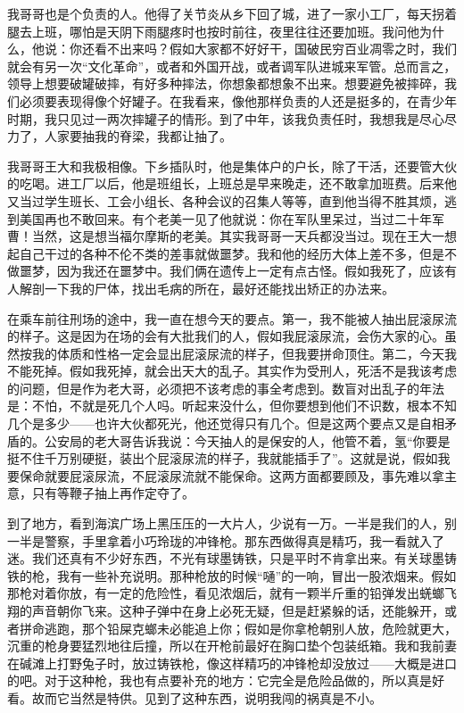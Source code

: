 我哥哥也是个负责的人。他得了关节炎从乡下回了城，进了一家小工厂，每天拐着腿去上班，哪怕是天阴下雨腿疼时也按时前往，夜里往往还要加班。我问他为什么，他说：你还看不出来吗？假如大家都不好好干，国破民穷百业凋零之时，我们就会有另一次“文化革命”，或者和外国开战，或者调军队进城来军管。总而言之，领导上想要破罐破摔，有好多种摔法，你想象都想象不出来。想要避免被摔碎，我们必须要表现得像个好罐子。在我看来，像他那样负责的人还是挺多的，在青少年时期，我只见过一两次摔罐子的情形。到了中年，该我负责任时，我想我是尽心尽力了，人家要抽我的脊梁，我都让抽了。 

我哥哥王大和我极相像。下乡插队时，他是集体户的户长，除了干活，还要管大伙的吃喝。进工厂以后，他是班组长，上班总是早来晚走，还不敢拿加班费。后来他又当过学生班长、工会小组长、各种会议的召集人等等，直到他当得不胜其烦，逃到美国再也不敢回来。有个老美一见了他就说：你在军队里呆过，当过二十年军曹！当然，这是想当福尔摩斯的老美。其实我哥哥一天兵都没当过。现在王大一想起自己干过的各种不伦不类的差事就做噩梦。我和他的经历大体上差不多，但是不做噩梦，因为我还在噩梦中。我们俩在遗传上一定有点古怪。假如我死了，应该有人解剖一下我的尸体，找出毛病的所在，最好还能找出矫正的办法来。 



在乘车前往刑场的途中，我一直在想今天的要点。第一，我不能被人抽出屁滚尿流的样子。这是因为在场的会有大批我们的人，假如我屁滚尿流，会伤大家的心。虽然按我的体质和性格一定会显出屁滚尿流的样子，但我要拼命顶住。第二，今天我不能死掉。假如我死掉，就会出天大的乱子。其实作为受刑人，死活不是我该考虑的问题，但是作为老大哥，必须把不该考虑的事全考虑到。数盲对出乱子的年法是：不怕，不就是死几个人吗。听起来没什么，但你要想到他们不识数，根本不知几个是多少——也许大伙都死光，他还觉得只有几个。但是这两个要点又是自相矛盾的。公安局的老大哥告诉我说：今天抽人的是保安的人，他管不着，氢“你要是挺不住千万别硬挺，装出个屁滚尿流的样子，我就能插手了”。这就是说，假如我要保命就要屁滚尿流，不屁滚尿流就不能保命。这两方面都要顾及，事先难以拿主意，只有等鞭子抽上再作定夺了。 



到了地方，看到海滨广场上黑压压的一大片人，少说有一万。一半是我们的人，别一半是警察，手里拿着小巧玲珑的冲锋枪。那东西做得真是精巧，我一看就入了迷。我们还真有不少好东西，不光有球墨铸铁，只是平时不肯拿出来。有关球墨铸铁的枪，我有一些补充说明。那种枪放的时候“嗵”的一响，冒出一股浓烟来。假如那枪对着你放，有一定的危险性，看见浓烟后，就有一颗半斤重的铅弹发出蜣螂飞翔的声音朝你飞来。这种子弹中在身上必死无疑，但是赶紧躲的话，还能躲开，或者拼命逃跑，那个铅屎克螂未必能追上你；假如是你拿枪朝别人放，危险就更大，沉重的枪身要猛烈地往后撞，所以在开枪前最好在胸口垫个包装纸箱。我和我前妻在碱滩上打野兔子时，放过铸铁枪，像这样精巧的冲锋枪却没放过——大概是进口的吧。对于这种枪，我也有点要补充的地方：它完全是危险品做的，所以真是好看。故而它当然是特供。见到了这种东西，说明我闯的祸真是不小。 

